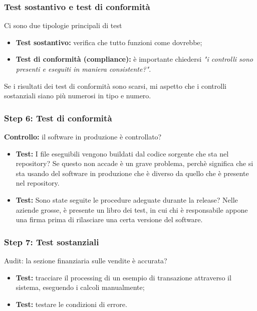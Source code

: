 \subsubsection{Test sostantivo e test di conformità}

Ci sono due tipologie principali di test
\begin{itemize}
\item \textbf{Test sostantivo:} verifica che tutto funzioni come dovrebbe;
\item \textbf{Test di conformità (compliance):} è importante chiedersi  \textit{"i controlli 
sono presenti e eseguiti in maniera consistente?"}.
\end{itemize}

Se i risultati dei test di conformità sono scarsi, mi aspetto che i controlli 
sostanziali siano più numerosi in tipo e numero.

\subsubsection{Step 6: Test di conformità}

\textbf{Controllo:} il software in produzione è controllato?
\begin{itemize}
\item \textbf{Test:} I file eseguibili vengono buildati dal codice sorgente che sta nel 
repository? Se questo non accade è un grave problema, perchè significa che si 
sta usando del software in produzione che è diverso da quello che è presente 
nel repository.
\item \textbf{Test:} Sono state seguite le procedure adeguate durante la release? Nelle 
aziende grosse, è presente un libro dei test, in cui chi è responsabile appone 
una firma prima di rilasciare una certa versione del software.
\end{itemize}


\subsubsection{Step 7: Test sostanziali}

Audit: la sezione finanziaria sulle vendite è accurata? 

\begin{itemize}
\item \textbf{Test:} tracciare il processing di un esempio di transazione attraverso il 
sistema, eseguendo i calcoli manualmente;
\item \textbf{Test:} testare le condizioni di errore.
\end{itemize}



